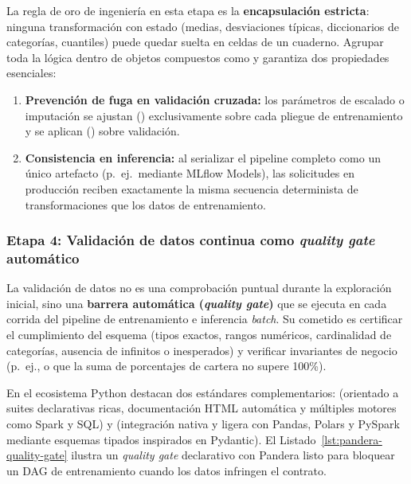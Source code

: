 La regla de oro de ingeniería en esta etapa es la \textbf{encapsulación estricta}: ninguna transformación con estado (medias, desviaciones típicas, diccionarios de categorías, cuantiles) puede quedar suelta en celdas de un cuaderno. Agrupar toda la lógica dentro de objetos compuestos como  y  garantiza dos propiedades esenciales:
\begin{enumerate}
  \item \textbf{Prevención de fuga en validación cruzada:} los parámetros de escalado o imputación se ajustan () exclusivamente sobre cada pliegue de entrenamiento y se aplican () sobre validación.
  \item \textbf{Consistencia en inferencia:} al serializar el pipeline completo como un único artefacto (p.~ej.\ mediante MLflow Models), las solicitudes en producción reciben exactamente la misma secuencia determinista de transformaciones que los datos de entrenamiento.
\end{enumerate}

\subsubsection{Etapa 4: Validación de datos continua como \textit{quality gate} automático}

La validación de datos no es una comprobación puntual durante la exploración inicial, sino una \textbf{barrera automática (\textit{quality gate})} que se ejecuta en cada corrida del pipeline de entrenamiento e inferencia \textit{batch}. Su cometido es certificar el cumplimiento del esquema (tipos exactos, rangos numéricos, cardinalidad de categorías, ausencia de infinitos o  inesperados) y verificar invariantes de negocio (p.~ej.,  o que la suma de porcentajes de cartera no supere 100\%).

En el ecosistema Python destacan dos estándares complementarios:  (orientado a suites declarativas ricas, documentación HTML automática y múltiples motores como Spark y SQL) y  (integración nativa y ligera con Pandas, Polars y PySpark mediante esquemas tipados inspirados en Pydantic). El Listado~\ref{lst:pandera-quality-gate} ilustra un \textit{quality gate} declarativo con Pandera listo para bloquear un DAG de entrenamiento cuando los datos infringen el contrato.

